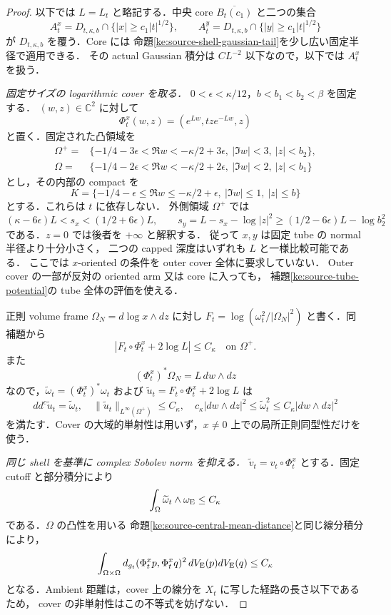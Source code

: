 \begin{proof}
以下では $L=L_t$ と略記する．中央 core $\overline{B_t(c_1)}$ と二つの集合
\[
 A^x_t=D_{t,\kappa,b}\cap\{|x|\ge c_1|t|^{1/2}\},\qquad
 A^y_t=D_{t,\kappa,b}\cap\{|y|\ge c_1|t|^{1/2}\}
\]
が $D_{t,\kappa,b}$ を覆う．Core には
命題\ref{ke:source-shell-gaussian-tail}を少し広い固定半径で適用できる．
その actual Gaussian 積分は $CL^{-2}$ 以下なので，以下では $A^x_t$ を扱う．

\emph{固定サイズの logarithmic cover を取る．}
$0<\epsilon<\kappa/12$，$b<b_1<b_2<\beta$ を固定する．
$(w,z)\in\mathbb C^2$ に対して
\[
 \Phi^x_t(w,z)=(e^{Lw},tze^{-Lw},z)
\]
と置く．固定された凸領域を
\[
 \begin{split}
 \Omega^+={}&\{-1/4-3\epsilon<\Re w<-\kappa/2+3\epsilon,
                \ |\Im w|<3,\ |z|<b_2\},\\
 \Omega={}&\{-1/4-2\epsilon<\Re w<-\kappa/2+2\epsilon,
                \ |\Im w|<2,\ |z|<b_1\}
 \end{split}
\]
とし，その内部の compact を
\[
 K=\{-1/4-\epsilon\le\Re w\le-\kappa/2+\epsilon,
          \ |\Im w|\le1,\ |z|\le b\}
\]
とする．これらは $t$ に依存しない．
外側領域 $\Omega^+$ では
\[
 (\kappa-6\epsilon)L<s_x<(1/2+6\epsilon)L,
 \qquad
 s_y=L-s_x-\log|z|^2
       \ge(1/2-6\epsilon)L-\log b_2^2
\]
である．$z=0$ では後者を $+\infty$ と解釈する．
従って $x,y$ は固定 tube の normal 半径より十分小さく，
二つの capped 深度はいずれも $L$ と一様比較可能である．
ここでは $x$-oriented の条件を outer cover 全体に要求していない．
Outer cover の一部が反対の oriented arm 又は core に入っても，
補題\ref{ke:source-tube-potential}の tube 全体の評価を使える．

正則 volume frame $\Omega_N=d\log x\wedge dz$ に対し
$F_t=\log(\omega_t^2/|\Omega_N|^2)$ と書く．同補題から
\[
 |F_t\circ\Phi^x_t+2\log L|\le C_\kappa
 \quad\text{on }\Omega^+.
\]
また
\[
 (\Phi^x_t)^*\Omega_N=L\,dw\wedge dz
\]
なので，$\widetilde\omega_t=(\Phi^x_t)^*\omega_t$ および
$\widetilde u_t=F_t\circ\Phi^x_t+2\log L$ は
\[
 dd^c\widetilde u_t=\widetilde\omega_t,
 \quad \|\widetilde u_t\|_{L^\infty(\Omega^+)}\le C_\kappa,
 \quad c_\kappa|dw\wedge dz|^2
       \le\widetilde\omega_t^2
       \le C_\kappa|dw\wedge dz|^2
\]
を満たす．Cover の大域的単射性は用いず，$x\ne0$ 上での局所正則同型性だけを使う．

\emph{同じ shell を基準に complex Sobolev norm を抑える．}
$\widetilde v_t=v_t\circ\Phi^x_t$ とする．固定 cutoff と部分積分により
\[
 \int_{\Omega}\widetilde\omega_t\wedge\omega_{\rm E}\le C_\kappa
\]
である．$\Omega$ の凸性を用いる
命題\ref{ke:source-central-mean-distance}と同じ線分積分により，
\[
 \int_{\Omega\times\Omega}
 d_{g_t}(\Phi^x_t p,\Phi^x_t q)^2\,dV_{\rm E}(p)dV_{\rm E}(q)
 \le C_\kappa
\]
となる．Ambient 距離は，cover 上の線分を $X_t$ に写した経路の長さ以下であるため，
cover の非単射性はこの不等式を妨げない．


\end{proof}
